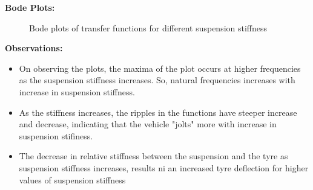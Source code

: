 \documentclass[12pt, a4paper, oneside]{report}
\begin{document}
    \textbf{Bode Plots:}
    \begin{figure}[H]
        \centering
        \hfill
        \hfill
        \par
        \caption{Bode plots of transfer functions for different suspension stiffness}
        \label{fig: open_loop_bode_ks}
    \end{figure}

    \textbf{Observations:}
    \begin{itemize}
        \item On observing the plots, the maxima of the plot occurs at higher frequencies as the
        suspension stiffness increases. So, natural frequencies increases with increase in suspension stiffness.
        \item As the stiffness increases, the ripples in the functions have steeper increase and decrease, indicating that the vehicle "jolts" more with increase in suspension stifiness.
        \item The decrease in relative stiffness between the suspension and the tyre as suspension
        stiffness increases, results ni an increased tyre deflection for higher values of suspension stiffness
    \end{itemize}
\end{document}
